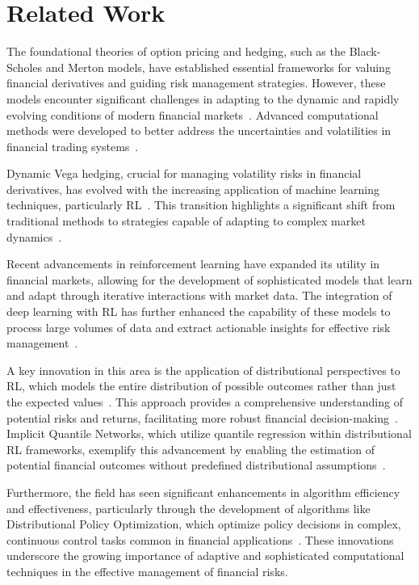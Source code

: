 \section{Related Work}
\label{related}
The foundational theories of option pricing and hedging, such as the Black-Scholes and Merton models, have established essential frameworks for valuing financial derivatives and guiding risk management strategies. However, these models encounter significant challenges in adapting to the dynamic and rapidly evolving conditions of modern financial markets~\cite{black1976pricing}\cite{merton1973theory}. Advanced computational methods were developed to better address the uncertainties and volatilities in financial trading systems~\cite{hull2016options}\cite{zhao2023federated}.

Dynamic Vega hedging, crucial for managing volatility risks in financial derivatives, has evolved with the increasing application of machine learning techniques, particularly RL~\cite{cao2023gamma}. This transition highlights a significant shift from traditional methods to strategies capable of adapting to complex market dynamics~\cite{kling2011impact}.

Recent advancements in reinforcement learning have expanded its utility in financial markets, allowing for the development of sophisticated models that learn and adapt through iterative interactions with market data. The integration of deep learning with RL has further enhanced the capability of these models to process large volumes of data and extract actionable insights for effective risk management~\cite{jiang2017deep}\cite{ moody2001learning}.

A key innovation in this area is the application of distributional perspectives to RL, which models the entire distribution of possible outcomes rather than just the expected values~\cite{huang2022distributional}\cite{duan2021distributional}. This approach provides a comprehensive understanding of potential risks and returns, facilitating more robust financial decision-making~\cite{bellemare2017distributional}. Implicit Quantile Networks, which utilize quantile regression within distributional RL frameworks, exemplify this advancement by enabling the estimation of potential financial outcomes without predefined distributional assumptions~\cite{dabney2018implicit}\cite{bai2022monotonic}.

Furthermore, the field has seen significant enhancements in algorithm efficiency and effectiveness, particularly through the development of algorithms like Distributional Policy Optimization, which optimize policy decisions in complex, continuous control tasks common in financial applications~\cite{tessler2019distributional}. These innovations underscore the growing importance of adaptive and sophisticated computational techniques in the effective management of financial risks.

